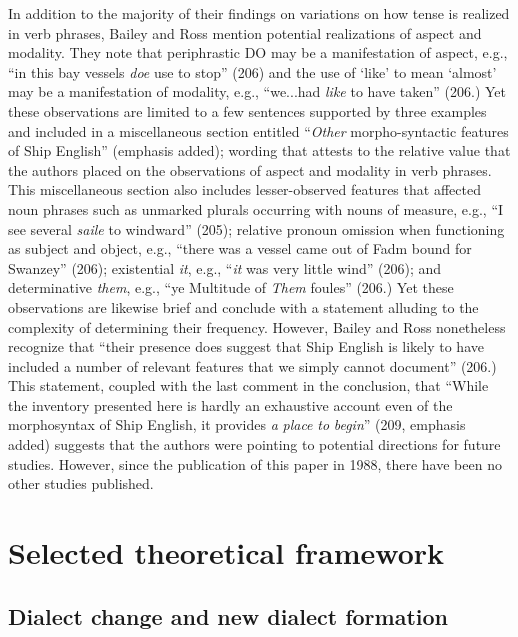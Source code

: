In addition to the majority of their findings on variations on how tense is realized in verb phrases, Bailey and Ross mention potential realizations of aspect and modality. They note that periphrastic DO may be a manifestation of aspect, e.g., “in this bay vessels \textit{doe} use to stop” (206) and the use of ‘like’ to mean ‘almost’ may be a manifestation of modality, e.g., “we...had \textit{like} to have taken” (206.) Yet these observations are limited to a few sentences supported by three examples and included in a miscellaneous section entitled “\textit{Other} morpho-syntactic features of Ship English” (emphasis added); wording that attests to the relative value that the authors placed on the observations of aspect and modality in verb phrases. This miscellaneous section also includes lesser-observed features that affected noun phrases such as unmarked plurals occurring with nouns of measure, e.g., “I see several \textit{saile} to windward” (205); relative pronoun omission when functioning as subject and object, e.g., “there was a vessel came out of Fadm bound for Swanzey” (206); existential \textit{it}, e.g., “\textit{it} was very little wind” (206); and determinative \textit{them}, e.g., “ye Multitude of \textit{Them} foules” (206.) Yet these observations are likewise brief and conclude with a statement alluding to the complexity of determining their frequency. However, Bailey and Ross nonetheless recognize that “their presence does suggest that Ship English is likely to have included a number of relevant features that we simply cannot document” (206.) This statement, coupled with the last comment in the conclusion, that “While the inventory presented here is hardly an exhaustive account even of the morphosyntax of Ship English, it provides \textit{a} \textit{place} \textit{to} \textit{begin}” (209, emphasis added) suggests that the authors were pointing to potential directions for future studies. However, since the publication of this paper in 1988, there have been no other studies published.  

\section{\textbf{Selected} \textbf{theoretical} \textbf{framework}}%

\subsection{\textbf{Dialect} \textbf{change} \textbf{and} \textbf{new} \textbf{dialect} \textbf{formation} }%

